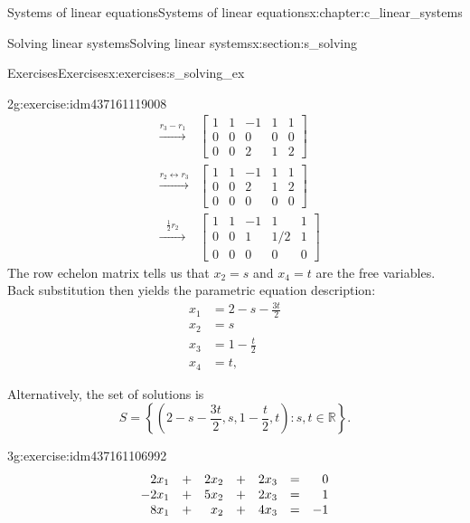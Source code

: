 \documentclass[oneside,10pt,]{book}
\makeatletter
\numberwithin{equation}{section}
\newcommand{\R}{{\mathbb R}}
\newenvironment{linsys}[2][m]{
\begin{array}[#1]{@{}*{#2}{rc}r@{}}
}{
\end{array}}
\newcommand{\amp}{&}
\makeatother
\begin{document}
\begin{chapterptx}{Systems of linear equations}{}{Systems of linear equations}{}{}{x:chapter:c_linear_systems}
\begin{sectionptx}{Solving linear systems}{}{Solving linear systems}{}{}{x:section:s_solving}
\begin{exercises-subsection-numberless}{Exercises}{}{Exercises}{}{}{x:exercises:s_solving_ex}
\begin{exercisegroup}
\begin{divisionexerciseeg}{2}{}{}{g:exercise:idm437161119008}
\begin{align*}
\amp \xrightarrow[\hspace{35pt}]{r_3-r_1}\amp \begin{bmatrix}1\amp 1\amp -1\amp 1\amp 1\\ 0\amp 0\amp 0\amp 0\amp 0\\ 0\amp 0\amp 2\amp 1\amp 2 \end{bmatrix}\\
\amp \xrightarrow[\hspace{35pt}]{r_2\leftrightarrow r_3 }\amp \begin{bmatrix}1\amp 1\amp -1\amp 1\amp 1\\ 0\amp 0\amp 2\amp 1\amp 2\\ 0\amp 0\amp 0\amp 0\amp 0 \end{bmatrix}\\
\amp \xrightarrow[\hspace{35pt}]{\frac{1}{2}r_2}\amp \begin{bmatrix}\boxed{1}\amp 1\amp -1\amp 1\amp 1\\ 0\amp 0\amp \boxed{1}\amp 1/2\amp 1\\ 0\amp 0\amp 0\amp 0\amp 0 \end{bmatrix}
\end{align*}
The row echelon matrix tells us that \(x_2=s\) and \(x_4=t\) are the free variables. Back substitution then yields the parametric equation description:%
\begin{align*}
x_1\amp = 2-s-\frac{3t}{2}\\
x_2\amp = s\\
x_3\amp = 1-\frac{t}{2}\\
x_4\amp = t\text{,}
\end{align*}
%
 \par
Alternatively, the set of solutions is%
\begin{equation*}
S=\left\{\left(2-s-\frac{3t}{2},s,1-\frac{t}{2},t\right)\colon s, t\in\R\right\}\text{.}
\end{equation*}
%
%
\end{divisionexerciseeg}%
\begin{divisionexerciseeg}{3}{}{}{g:exercise:idm437161106992}%
%
\begin{equation*}
\begin{linsys}{3} 2x_1 \amp +\amp  2x_2  \amp +\amp 2x_3\amp =\amp 0\\ -2x_1 \amp +\amp  5x_2 \amp +\amp 2x_3\amp =\amp 1\\ 8x_1 \amp +\amp   x_2   \amp +\amp 4x_3\amp =\amp -1 \end{linsys}
\end{equation*}

\end{divisionexerciseeg}
\end{exercisegroup}
\end{exercises-subsection-numberless}
\end{sectionptx}
\end{chapterptx}
\end{document}
